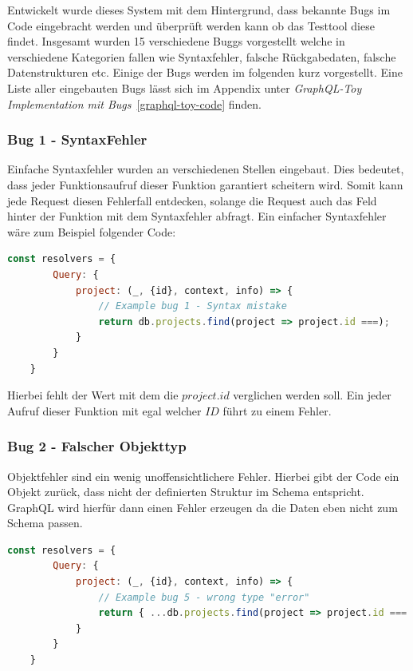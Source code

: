 Entwickelt wurde dieses System mit dem Hintergrund, dass bekannte Bugs im Code eingebracht werden und überprüft werden kann ob das Testtool diese findet.
Insgesamt wurden 15 verschiedene Buggs vorgestellt welche in verschiedene Kategorien fallen wie Syntaxfehler, falsche Rückgabedaten, falsche Datenstrukturen etc.
Einige der Bugs werden im folgenden kurz vorgestellt.
Eine Liste aller eingebauten Bugs lässt sich im Appendix unter \textit{GraphQL-Toy Implementation mit Bugs}~\ref{graphql-toy-code} finden.

\subsubsection{Bug 1 - SyntaxFehler}

Einfache Syntaxfehler wurden an verschiedenen Stellen eingebaut.
Dies bedeutet, dass jeder Funktionsaufruf dieser Funktion garantiert scheitern wird.
Somit kann jede Request diesen Fehlerfall entdecken, solange die Request auch das Feld hinter der Funktion mit dem Syntaxfehler abfragt.
Ein einfacher Syntaxfehler wäre zum Beispiel folgender Code: \\

\begin{lstlisting}[language=javascript]
    const resolvers = {
        Query: {
            project: (_, {id}, context, info) => {
                // Example bug 1 - Syntax mistake
                return db.projects.find(project => project.id ===);
            }
        }
    }
\end{lstlisting}

Hierbei fehlt der Wert mit dem die $project.id$ verglichen werden soll.
Ein jeder Aufruf dieser Funktion mit egal welcher $ID$ führt zu einem Fehler.

\subsubsection{Bug 2 - Falscher Objekttyp}

Objektfehler sind ein wenig unoffensichtlichere Fehler.
Hierbei gibt der Code ein Objekt zurück, dass nicht der definierten Struktur im Schema entspricht.
GraphQL wird hierfür dann einen Fehler erzeugen da die Daten eben nicht zum Schema passen.

\begin{lstlisting}[language=javascript]
    const resolvers = {
        Query: {
            project: (_, {id}, context, info) => {
                // Example bug 5 - wrong type "error"
                return { ...db.projects.find(project => project.id === id), name: ["a", "b"] };
            }
        }
    }
\end{lstlisting}

